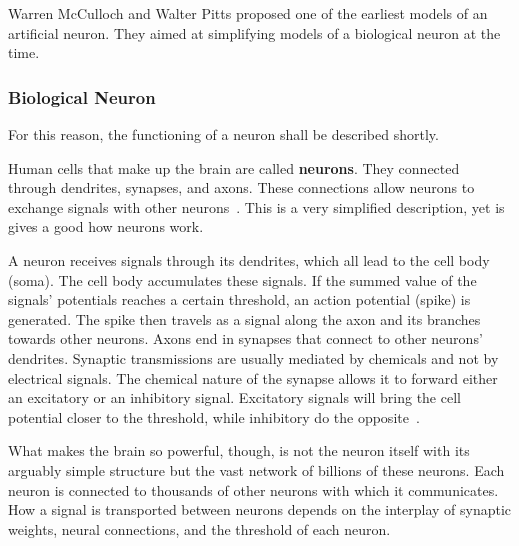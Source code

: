 Warren McCulloch and Walter Pitts proposed one of the earliest models of an artificial neuron.
They aimed at simplifying models of a biological neuron at the time.

\subsubsection{Biological Neuron}
For this reason, the functioning of a neuron shall be described shortly.

Human cells that make up the brain are called \textbf{neurons}.
They connected through dendrites, synapses, and axons.
These connections allow neurons to exchange signals with other neurons~\cite{grosse}.
This is a very simplified description, yet is gives a good how neurons work. 

A neuron receives signals through its dendrites, which all lead to the cell body (soma).
The cell body accumulates these signals.
If the summed value of the signals' potentials reaches a certain threshold, an action potential (spike) is generated.
The spike then travels as a signal along the axon and its branches towards other neurons.
Axons end in synapses that connect to other neurons' dendrites.
Synaptic transmissions are usually mediated by chemicals and not by electrical signals.
The chemical nature of the synapse allows it to forward either an excitatory or an inhibitory signal.
Excitatory signals will bring the cell potential closer to the threshold, while inhibitory do the opposite~\cite[p.~42]{coloratlas}.

What makes the brain so powerful, though, is not the neuron itself with its arguably simple structure but the vast network of billions of these neurons.
Each neuron is connected to thousands of other neurons with which it communicates.
How a signal is transported between neurons depends on the interplay of synaptic weights, neural connections, and the threshold of each neuron.

